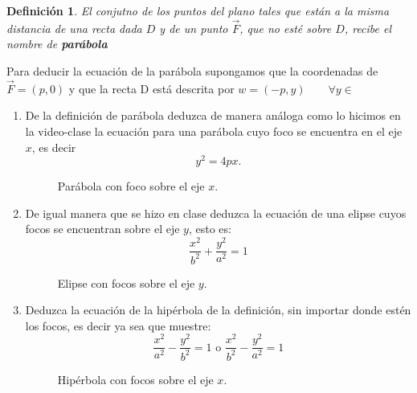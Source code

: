 \documentclass[letterpaper,11pt]{article}
\newtheorem{definition}{Definición}
\renewcommand{\*}{\cdot}
\begin{document}
\begin{definition}
	El conjutno de los puntos del plano tales que están a la misma distancia de una recta dada $ D $ y de un punto $ \vec{F} $, que no esté sobre $ D $, recibe el nombre de \textbf{parábola}
\end{definition}
Para deducir la ecuación de la parábola supongamos que la coordenadas de $ \vec{F} = (p,0) $ y que la recta D está descrita por $ w = (-p,y) \qquad \forall y \in $
\begin{enumerate}


\item  De la definición de parábola deduzca de manera análoga como lo hicimos en la video-clase la ecuación para una parábola cuyo foco se encuentra en el eje $x$, es decir $$y^2 = 4px.$$ 


\begin{figure}[h!]
\centering
\caption{Parábola con foco sobre el eje $x$.}
\label{F1}
\end{figure}

\newpage
\item De igual manera que se hizo en clase deduzca la ecuación de una elipse cuyos focos se encuentran sobre el eje $y$, esto es: $$\dfrac{x^2}{b^2} + \dfrac{y^2}{a^2}=1$$

\begin{figure}[h!]
\centering
\caption{Elipse con focos sobre el eje $y$.}
\label{F1}
\end{figure}



\item Deduzca la ecuación de la hipérbola de la definición, sin importar donde estén los focos, es decir ya sea que muestre: $$\dfrac{x^2}{a^2} -  \dfrac{y^2}{b^2} = 1 \text{ o }  \dfrac{x^2}{b^2} - \dfrac{y^2}{a^2}=1$$

\begin{figure}[h!]
\centering
\caption{Hipérbola con focos sobre el eje $x$.}
\label{F1}
\end{figure}




\end{enumerate}
\end{document}
